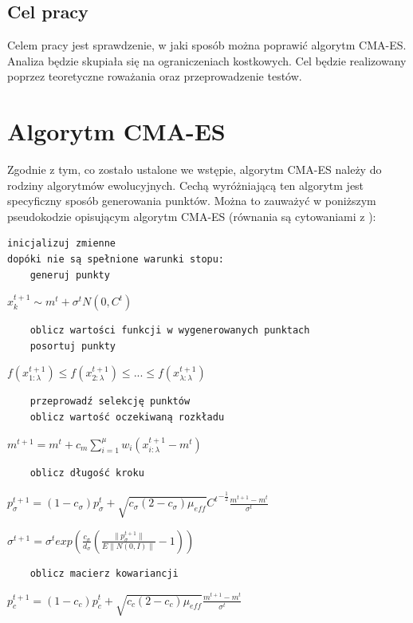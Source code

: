 \documentclass{mini}
\begin{document}
\subsection*{Cel pracy}
Celem pracy jest sprawdzenie, w jaki sposób można poprawić algorytm CMA-ES. Analiza będzie skupiała się na ograniczeniach kostkowych. Cel będzie realizowany poprzez teoretyczne roważania oraz przeprowadzenie testów.

\pagebreak

\section{Algorytm CMA-ES} \label{secalgcmaes}

Zgodnie z tym, co zostało ustalone we wstępie, algorytm CMA-ES należy do rodziny algorytmów ewolucyjnych. Cechą wyróżniającą ten algorytm jest specyficzny sposób generowania punktów. Można to zauważyć w poniższym pseudokodzie opisującym algorytm CMA-ES (równania są cytowaniami z \cite{cmaes_tutorial}):
\begin{Verbatim}
inicjalizuj zmienne
dopóki nie są spełnione warunki stopu:
	generuj punkty
\end{Verbatim}
\hspace{12ex} $x_k^{t+1} \sim m^t + \sigma^tN(0,C^t)$
\begin{Verbatim}
	oblicz wartości funkcji w wygenerowanych punktach
	posortuj punkty
\end{Verbatim}
\hspace{12ex} $f(x_{1:\lambda}^{t+1}) \leq f(x_{2:\lambda}^{t+1}) \leq ... \leq f(x_{\lambda:\lambda}^{t+1})$
\begin{Verbatim}
	przeprowadź selekcję punktów
	oblicz wartość oczekiwaną rozkładu
\end{Verbatim}
\hspace{12ex} $m^{t+1}=m^t+c_m\sum\limits_{i=1}^\mu w_i(x_{i:\lambda}^{t+1}-m^t)$
\begin{Verbatim}
	oblicz długość kroku
\end{Verbatim}
\hspace{12ex} $p_\sigma^{t+1}=(1-c_\sigma)p_\sigma^t+\sqrt{c_\sigma(2-c_\sigma)\mu_{eff}}{C^t}^{-\frac{1}{2}}\frac{m^{t+1}-m^t}{\sigma^t}$

\hspace{8,5ex} $\sigma^{t+1}=\sigma^t exp (\frac{c_\sigma}{d_\sigma}(\frac{\|p_\sigma^{t+1}\|}{E\|N(0,I)\|}-1))$
\begin{Verbatim}
	oblicz macierz kowariancji
\end{Verbatim}
\hspace{12ex} $p_c^{t+1} = (1-c_c)p_c^t+\sqrt{c_c(2-c_c)\mu_{eff}}\frac{m^{t+1}-m^t}{\sigma^t}$
\end{document}
